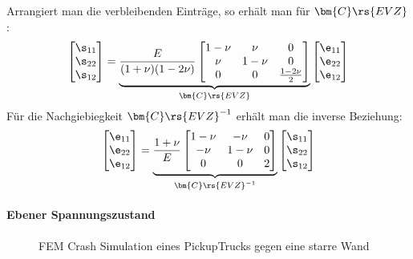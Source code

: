 \documentclass[letterpaper,10pt,german]{jupyterBook}
\let\sphinxpxdimen\pdfpxdimen\else\newdimen\sphinxpxdimen
\begin{document}
\sphinxAtStartPar
Arrangiert man die verbleibenden Einträge, so erhält man für \(\bm{C}\rs{EVZ}\):
\begin{equation}\label{equation:chapters/chapter1/elasticity:evz2}
\begin{split} \begin{bmatrix} 
\s_{11} \\
\s_{22} \\
\s_{12} 
\end{bmatrix}= \underbrace{\frac{E }{(1+\nu)(1-2\nu)} \begin{bmatrix}
1-\nu & \nu & 0 \\
\nu & 1-\nu & 0 \\
0 & 0 & \frac{1-2\nu}{2}
\end{bmatrix}}_{\bm{C}\rs{EVZ}}  \begin{bmatrix} 
\e_{11} \\
\e_{22} \\
\e_{12} 
\end{bmatrix}\end{split}
\end{equation}
\sphinxAtStartPar
Für die Nachgiebiegkeit \(\bm{C}\rs{EVZ}^{-1}\) erhält man die inverse Beziehung:
\begin{equation}\label{equation:chapters/chapter1/elasticity:evz3}
\begin{split} \begin{bmatrix} 
\e_{11} \\
\e_{22} \\
\e_{12} 
\end{bmatrix}= \underbrace{\frac{1+\nu }{E} \begin{bmatrix}
1-\nu & -\nu & 0 \\
-\nu & 1-\nu & 0 \\
0 & 0 & 2
\end{bmatrix}}_{\bm{C}\rs{EVZ}^{-1}}  \begin{bmatrix} 
\s_{11} \\
\s_{22} \\
\s_{12} 
\end{bmatrix}\end{split}
\end{equation}

\paragraph{Ebener Spannungszustand}
\label{\detokenize{chapters/chapter1/elasticity:ebener-spannungszustand}}
\begin{figure}[htbp]
\centering
\capstart

\noindent\sphinxincludegraphics[height=500\sphinxpxdimen]{{CarCrash}.jpg}
\caption{FEM Crash Simulation eines Pickup\sphinxhyphen{}Trucks gegen eine starre Wand }\label{\detokenize{chapters/chapter1/elasticity:carcrash}}\end{figure}
\end{document}
